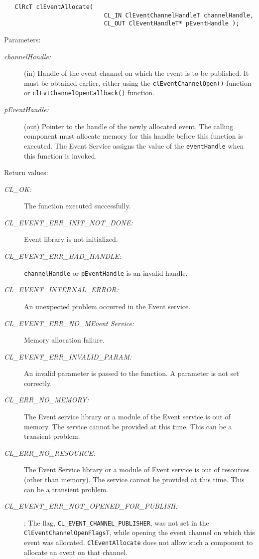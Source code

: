 \begin{flushleft}
\begin{Desc}
\footnotesize\begin{verbatim}   ClRcT clEventAllocate(
              				CL_IN ClEventChannelHandleT channelHandle,
              				CL_OUT ClEventHandleT* pEventHandle );
\end{verbatim}
\normalsize
\end{Desc}
\begin{Desc}
\item[Parameters:]
\begin{description}
\item[{\em channel\-Handle:}](in) Handle of the event channel on which the event is to be published. It must be obtained earlier, either using the 
{\tt{clEventChannelOpen()}} function or {\tt{clEvtChannelOpenCallback()}} function. 
\item[{\em p\-Event\-Handle:}](out) Pointer to the handle of the newly allocated event. The calling component must allocate memory for this handle before
this function is executed. The Event Service assigns the value of the {\tt{eventHandle}} when this function is invoked. 
\end{description}
\end{Desc}
\begin{Desc}
\item[Return values:]
\begin{description}
\item[{\em CL\_\-OK:}]The function executed successfully. 
\item[{\em CL\_\-EVENT\_\-ERR\_\-INIT\_\-NOT\_\-DONE:}]Event library is not initialized. 
\item[{\em CL\_\-EVENT\_\-ERR\_\-BAD\_\-HANDLE:}]{\tt{channelHandle}} or {\tt{pEventHandle}} is an invalid handle. 
\item[{\em CL\_\-EVENT\_\-INTERNAL\_\-ERROR:}]An unexpected problem occurred in the Event service. 
\item[{\em CL\_\-EVENT\_\-ERR\_\-NO\_\-MEvent Service:}]Memory allocation failure. 
\item[{\em CL\_\-EVENT\_\-ERR\_\-INVALID\_\-PARAM:}]An invalid parameter is passed to the function. A parameter is not set correctly.
\item[{\em CL\_\-ERR\_\-NO\_\-MEMORY:}]The Event service library or a module of the Event service is out of memory. The service cannot be 
provided at this time. This can be a transient problem.
\item[{\em CL\_\-ERR\_\-NO\_\-RESOURCE:}]The Event Service library or a module of Event service is out of resources (other than memory).
The service cannot be provided at this time. This can be a transient problem.
\item[{\em CL\_\-EVENT\_\-ERR\_\-NOT\_\-OPENED\_\-FOR\_\-PUBLISH:}]: The flag, {\tt{CL\_\-EVENT\_\-CHANNEL\_\-PUBLISHER}}, was not set in the 
{\tt{ClEventChannelOpenFlagsT}}, while opening the event channel on which this event was allocated.
{\tt{ClEventAllocate}} does not allow such a component to allocate an event on that channel. 


\end{description}
\end{Desc}
\end{flushleft}
